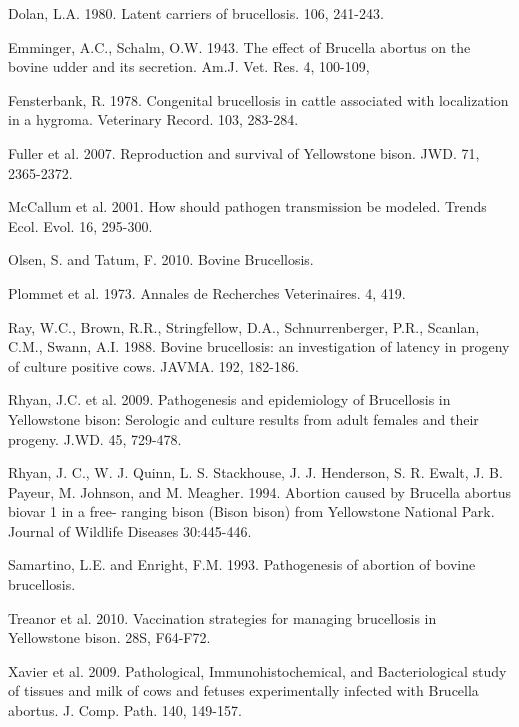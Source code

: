 \documentclass[letterpaper,12pt]{article}
\begin{document}
Dolan, L.A. 1980. Latent carriers of brucellosis. 106, 241-243. 

Emminger, A.C., Schalm, O.W. 1943. The effect of Brucella abortus on the bovine udder and its secretion. Am.J. Vet. Res. 4, 100-109, 

Fensterbank, R. 1978. Congenital brucellosis in cattle associated with localization in a hygroma. Veterinary Record. 103, 283-284.

Fuller et al. 2007. Reproduction and survival of Yellowstone bison. JWD. 71, 2365-2372.

McCallum et al. 2001. How should pathogen transmission be modeled. Trends Ecol. Evol. 16, 295-300.

Olsen, S. and Tatum, F. 2010. Bovine Brucellosis.

Plommet et al. 1973. Annales de Recherches Veterinaires. 4, 419. %

Ray, W.C., Brown, R.R., Stringfellow, D.A., Schnurrenberger, P.R., Scanlan, C.M., Swann, A.I. 1988. Bovine brucellosis: an investigation of latency in progeny of culture positive cows. JAVMA. 192, 182-186.

Rhyan, J.C. et al. 2009. Pathogenesis and epidemiology of Brucellosis in Yellowstone bison: Serologic and culture results from adult females and their progeny. J.WD. 45, 729-478.

Rhyan, J. C., W. J. Quinn, L. S. Stackhouse, J. J. Henderson, S. R. Ewalt, J. B. Payeur, M. Johnson, and M. Meagher. 1994. Abortion caused by Brucella abortus biovar 1 in a free- ranging bison (Bison bison) from Yellowstone National Park. Journal of Wildlife Diseases 30:445-446.

Samartino, L.E. and Enright, F.M. 1993. Pathogenesis of abortion of bovine brucellosis. 

Treanor et al. 2010. Vaccination strategies for managing brucellosis in Yellowstone bison. 28S, F64-F72.

Xavier et al. 2009. Pathological, Immunohistochemical, and Bacteriological study of tissues and milk of cows and fetuses experimentally infected with Brucella abortus. J. Comp. Path. 140, 149-157. 
\end{document}

